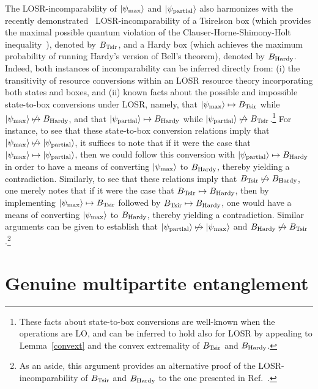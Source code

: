 \documentclass[12pt]{article}
\newcommand{\ket}[1]{\left| #1 \right>}
\theoremstyle{plain}
\theoremstyle{definition}
\begin{document}
The LOSR-incomparability of $\ket{\psi_{\rm max}}$ and $\ket{\psi_{\rm partial}}$ also harmonizes with the recently demonstrated~\cite{wolfe2020quantifying} LOSR-incomparability of a Tsirelson box (which provides the maximal possible quantum violation of the  Clauser-Horne-Shimony-Holt inequality~\cite{CHSH}), denoted by $B_{\rm Tsir}$, and a Hardy box (which achieves the maximum
 probability of running Hardy's version of Bell's theorem), denoted by $B_{\rm Hardy}$. 
Indeed, both instances of incomparability can be inferred directly from: (i) the transitivity of resource conversions within an LOSR resource theory incorporating both states and boxes, and (ii)
known facts about the possible and impossible state-to-box conversions under LOSR, namely, that $\ket{\psi_{\rm max}} \mapsto B_{\rm Tsir}$ while  $\ket{\psi_{\rm max}} \not\mapsto B_{\rm Hardy}$, and that $\ket{\psi_{\rm partial}} \mapsto B_{\rm Hardy}$ while $\ket{\psi_{\rm partial}} \not\mapsto B_{\rm Tsir}$.\footnote{These facts about state-to-box conversions are well-known when the operations are LO, and can be inferred to hold also for LOSR by appealing to Lemma~\ref{convext} and the convex extremality of $B_{\rm Tsir}$ and $B_{\rm Hardy}$.}
  For instance, to see that these state-to-box conversion relations imply that $\ket{\psi_{\rm max}} \not\mapsto \ket{\psi_{\rm partial}}$, it suffices to note that if it were the case that $\ket{\psi_{\rm max}} \mapsto \ket{\psi_{\rm partial}}$, then we could follow this conversion with $\ket{\psi_{\rm partial}} \mapsto B_{\rm Hardy}$ in order to have a means of converting $\ket{\psi_{\rm max}}$ to $B_{\rm Hardy}$,  thereby yielding a contradiction.  Similarly, to see that these relations imply that $B_{\rm Tsir} \not\mapsto B_{\rm Hardy}$, one merely notes that if it were the case that $B_{\rm Tsir} \mapsto B_{\rm Hardy}$, then by implementing $\ket{\psi_{\rm max}} \mapsto B_{\rm Tsir}$ followed by $B_{\rm Tsir} \mapsto B_{\rm Hardy}$, one would have a means of converting $\ket{\psi_{\rm max}}$ to $B_{\rm Hardy}$, thereby yielding a contradiction.  Similar arguments can be given to establish that $\ket{\psi_{\rm partial}} \not\mapsto \ket{\psi_{\rm max}}$ and $B_{\rm Hardy} \not\mapsto B_{\rm Tsir}$.\footnote{As an aside, this argument provides an alternative proof of the LOSR-incomparability of $B_{\rm Tsir}$ and $B_{\rm Hardy}$ to the one presented in Ref.~\cite{wolfe2020quantifying}.}



\section{Genuine multipartite entanglement}\label{sec:multipartite}
\end{document}
